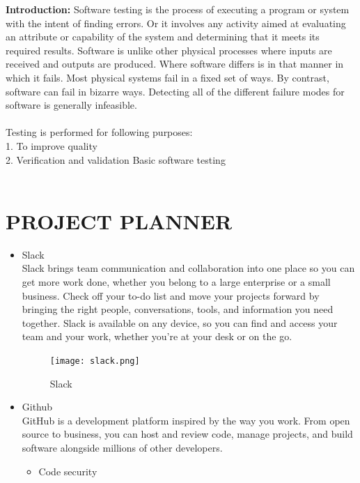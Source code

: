 \documentclass[oneside,a4paper,12pt]{report}
\begin{document}
\begin{appendices}
\begin{itemize}
\textbf{Introduction:} Software testing is the process of executing a program or system with the intent of finding errors. Or it involves any activity aimed at evaluating an attribute or capability of the system and determining that it meets its required results. Software is unlike other physical processes where inputs are received and outputs are produced. Where software differs is in that manner in which it fails. Most physical systems fail in a ﬁxed set of ways. By contrast, software can fail in bizarre ways. Detecting all of the different failure modes for software is generally infeasible.\\ 
\\
\hspace*{0.3 in}Testing is performed for following purposes:\\ 
\hspace*{0.3 in}1. To improve quality\\
\hspace*{0.3 in}2. Veriﬁcation and validation Basic software testing \\
\\
\chapter{PROJECT PLANNER}
\newpage
\begin{itemize}

\item Slack
\\
Slack brings team communication and collaboration into one place so you can get more work done, whether you belong to a large enterprise or a small business. Check off your to-do list and move your projects forward by bringing the right people, conversations, tools, and information you need together. Slack is available on any device, so you can find and access your team and your work, whether you’re at your desk or on the go.

\begin{figure}[h]
\centering
\texttt{[image: slack.png]}
\caption{Slack}
\end{figure}
\item Github
\\
GitHub is a development platform inspired by the way you work. From open source to business, you can host and review code, manage projects, and build software alongside millions of other developers.
\begin{itemize}
\item Code security


\end{itemize}
\end{itemize}
\end{itemize}
\end{appendices}
\end{document}
